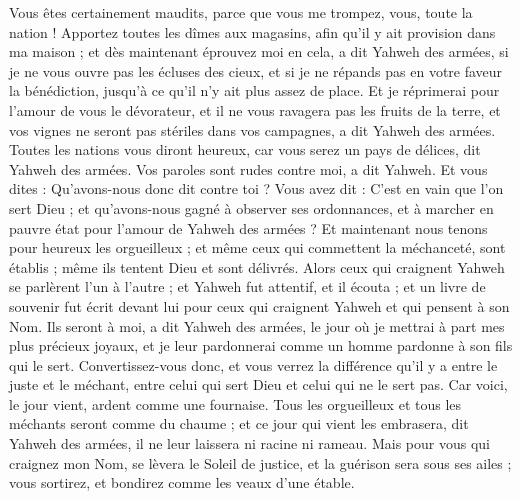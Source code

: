 \begin{multicols}{2}
Vous êtes certainement maudits, parce que vous me trompez, vous, toute la nation !
Apportez toutes les dîmes aux magasins, afin qu'il y ait provision dans ma maison ; et dès maintenant éprouvez moi en cela, a dit Yahweh des armées, si je ne vous ouvre pas les écluses des cieux, et si je ne répands pas en votre faveur la bénédiction, jusqu'à ce qu'il n'y ait plus assez de place.
Et je réprimerai pour l'amour de vous le dévorateur, et il ne vous ravagera pas les fruits de la terre, et vos vignes ne seront pas stériles dans vos campagnes, a dit Yahweh des armées.
Toutes les nations vous diront heureux, car vous serez un pays de délices, dit Yahweh des armées.
Vos paroles sont rudes contre moi, a dit Yahweh. Et vous dites : Qu'avons-nous donc dit contre toi ?
Vous avez dit : C'est en vain que l'on sert Dieu ; et qu'avons-nous gagné à observer ses ordonnances, et à marcher en pauvre état pour l'amour de Yahweh des armées ?
Et maintenant nous tenons pour heureux les orgueilleux ; et même ceux qui commettent la méchanceté, sont établis ; même ils tentent Dieu et sont délivrés.
Alors ceux qui craignent Yahweh se parlèrent l'un à l'autre ; et Yahweh fut attentif, et il écouta ; et un livre de souvenir fut écrit devant lui pour ceux qui craignent Yahweh et qui pensent à son Nom.
Ils seront à moi, a dit Yahweh des armées, le jour où je mettrai à part mes plus précieux joyaux, et je leur pardonnerai comme un homme pardonne à son fils qui le sert.
Convertissez-vous donc, et vous verrez la différence qu'il y a entre le juste et le méchant, entre celui qui sert Dieu et celui qui ne le sert pas.
\VerseOne{}Car voici, le jour vient, ardent comme une fournaise. Tous les orgueilleux et tous les méchants seront comme du chaume ; et ce jour qui vient les embrasera, dit Yahweh des armées, il ne leur laissera ni racine ni rameau.
Mais pour vous qui craignez mon Nom, se lèvera le Soleil de justice, et la guérison sera sous ses ailes ; vous sortirez, et bondirez comme les veaux d'une étable.

\end{multicols}
